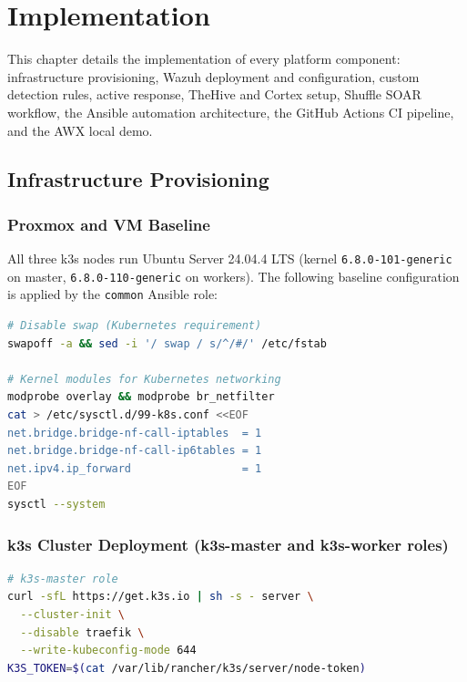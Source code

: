 \documentclass[12pt,a4paper]{report}
\begin{document}
\chapter{Implementation}
\label{chap:impl}
\minitoc
\vspace{1cm}

This chapter details the implementation of every platform component: infrastructure provisioning, Wazuh deployment and configuration, custom detection rules, active response, TheHive and Cortex setup, Shuffle SOAR workflow, the Ansible automation architecture, the GitHub Actions CI pipeline, and the AWX local demo.

\section{Infrastructure Provisioning}

\subsection{Proxmox and VM Baseline}

All three k3s nodes run Ubuntu Server 24.04.4 LTS (kernel \texttt{6.8.0-101-generic} on master, \texttt{6.8.0-110-generic} on workers). The following baseline configuration is applied by the \texttt{common} Ansible role:

\begin{lstlisting}[language=bash, caption=Baseline node configuration (common role)]
# Disable swap (Kubernetes requirement)
swapoff -a && sed -i '/ swap / s/^/#/' /etc/fstab

# Kernel modules for Kubernetes networking
modprobe overlay && modprobe br_netfilter
cat > /etc/sysctl.d/99-k8s.conf <<EOF
net.bridge.bridge-nf-call-iptables  = 1
net.bridge.bridge-nf-call-ip6tables = 1
net.ipv4.ip_forward                 = 1
EOF
sysctl --system
\end{lstlisting}

\subsection{k3s Cluster Deployment (k3s-master and k3s-worker roles)}

\begin{lstlisting}[language=bash, caption=k3s master installation]
# k3s-master role
curl -sfL https://get.k3s.io | sh -s - server \
  --cluster-init \
  --disable traefik \
  --write-kubeconfig-mode 644
K3S_TOKEN=$(cat /var/lib/rancher/k3s/server/node-token)
\end{lstlisting}
\end{document}
